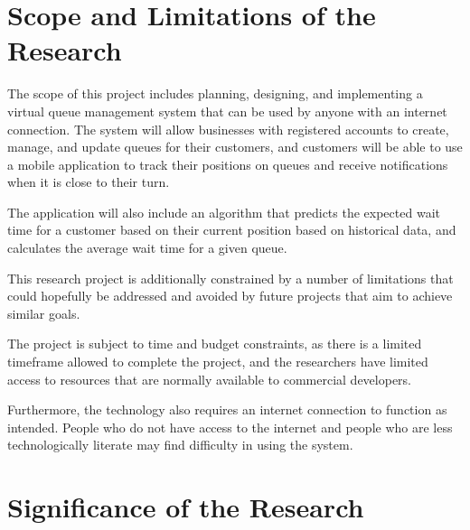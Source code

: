 \section{Scope and Limitations of the Research}
\label{sec:scopelimitations}

The scope of this project includes planning, designing, and implementing a virtual queue management system that can be used by anyone with an internet connection.
The system will allow businesses with registered accounts to create, manage, and update queues for their customers, and customers will be able to use a mobile application to track their positions on queues and receive notifications when it is close to their turn.

The application will also include an algorithm that predicts the expected wait time for a customer based on their current position based on historical data, and calculates the average wait time for a given queue.

This research project is additionally constrained by a number of limitations that could hopefully be addressed and avoided by future projects that aim to achieve similar goals.

The project is subject to time and budget constraints, as there is a limited timeframe allowed to complete the project, and the researchers have limited access to resources that are normally available to commercial developers.

Furthermore, the technology also requires an internet connection to function as intended. People who do not have access to the internet and people who are less technologically literate may find difficulty in using the system.


\begin{comment}

%
%
Generally, one paragraph should be allotted for each of your research objectives.

Each paragraph contains a brief overview of the concept/theory and the purpose of doing the associated objective.

Each paragraph also includes a description of the scope/limitation of your study.

* Please refer to the slides for examples.

\end{comment}


\section{Significance of the Research}
\label{sec:significance}

